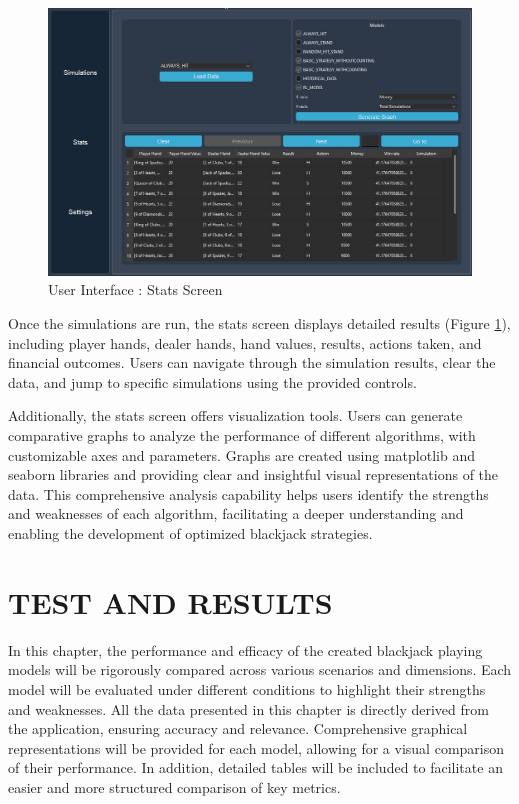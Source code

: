 \documentclass[a4paper,12pt]{report}
\begin{document}
\begin{figure}[htbp]
\begin{center}
\includegraphics[scale=0.35]{stats screen.png}
\end{center}
\caption{User Interface : Stats Screen}
\label{fig:stats_screen}
\end{figure}

Once the simulations are run, the stats screen displays detailed results (Figure \ref{fig:stats_screen}), including player hands, dealer hands, hand values, results, actions taken, and financial outcomes. Users can navigate through the simulation results, clear the data, and jump to specific simulations using the provided controls.

Additionally, the stats screen offers visualization tools. Users can generate comparative graphs to analyze the performance of different algorithms, with customizable axes and parameters. Graphs are created using matplotlib and seaborn libraries and providing clear and insightful visual representations of the data. This comprehensive analysis capability helps users identify the strengths and weaknesses of each algorithm, facilitating a deeper understanding and enabling the development of optimized blackjack strategies.

\chapter{TEST AND RESULTS}
\label{test-and-results}
In this chapter, the performance and efficacy of the created blackjack playing models will be rigorously compared across various scenarios and dimensions. Each model will be evaluated under different conditions to highlight their strengths and weaknesses. All the data presented in this chapter is directly derived from the application, ensuring accuracy and relevance. Comprehensive graphical representations will be provided for each model, allowing for a visual comparison of their performance. In addition, detailed tables will be included to facilitate an easier and more structured comparison of key metrics.
\end{document}
